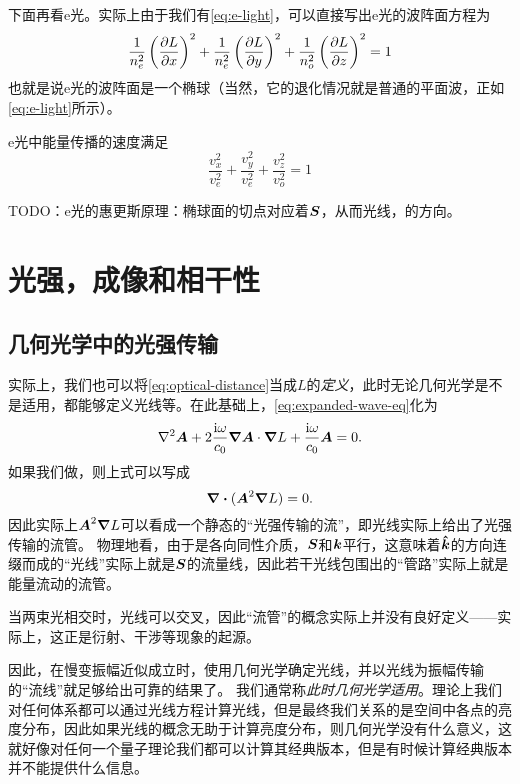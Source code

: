 下面再看e光。实际上由于我们有\eqref{eq:e-light}，可以直接写出e光的波阵面方程为
\begin{equation}
    \frac{1}{n_e^2} \left( \pdv{L}{x} \right)^2 + \frac{1}{n_e^2} \left( \pdv{L}{y} \right)^2 + \frac{1}{n_o^2} \left( \pdv{L}{z} \right)^2 = 1
\end{equation}
也就是说e光的波阵面是一个椭球（当然，它的退化情况就是普通的平面波，正如\eqref{eq:e-light}所示）。

e光中能量传播的速度满足
\begin{equation}
    \frac{v_x^2}{v_e^2} + \frac{v_y^2}{v_e^2} + \frac{v_z^2}{v_o^2} = 1
\end{equation}

TODO：e光的惠更斯原理：椭球面的切点对应着$\vb*{S}$，从而光线，的方向。

\section{光强，成像和相干性}

\subsection{几何光学中的光强传输}

实际上，我们也可以将\eqref{eq:optical-distance}当成$L$的\emph{定义}，此时无论几何光学是不是适用，都能够定义光线等。在此基础上，\eqref{eq:expanded-wave-eq}化为
\begin{equation}
    \laplacian \vb*{A} + 2 \frac{\ii \omega}{c_0} \grad{\vb*{A}} \cdot \grad{L} + \frac{\ii \omega}{c_0} \vb*{A} = 0.
\end{equation}
如果我们做，则上式可以写成
\begin{equation}
    \div{(\vb*{A}^2 \grad{L})} = 0.
\end{equation}
因此实际上$\vb*{A}^2 \grad{L}$可以看成一个静态的“光强传输的流”，即光线实际上给出了光强传输的流管。
物理地看，由于是各向同性介质，$\vb*{S}$和$\vb*{k}$平行，这意味着$\vu*{k}$的方向连缀而成的“光线”实际上就是$\vb*{S}$的流量线，因此若干光线包围出的“管路”实际上就是能量流动的流管。

当两束光相交时，光线可以交叉，因此“流管”的概念实际上并没有良好定义——实际上，这正是衍射、干涉等现象的起源。%

因此，在慢变振幅近似成立时，使用几何光学确定光线，并以光线为振幅传输的“流线”就足够给出可靠的结果了。
我们通常称\emph{此时几何光学适用}。理论上我们对任何体系都可以通过光线方程计算光线，但是最终我们关系的是空间中各点的亮度分布，因此如果光线的概念无助于计算亮度分布，则几何光学没有什么意义，这就好像对任何一个量子理论我们都可以计算其经典版本，但是有时候计算经典版本并不能提供什么信息。

